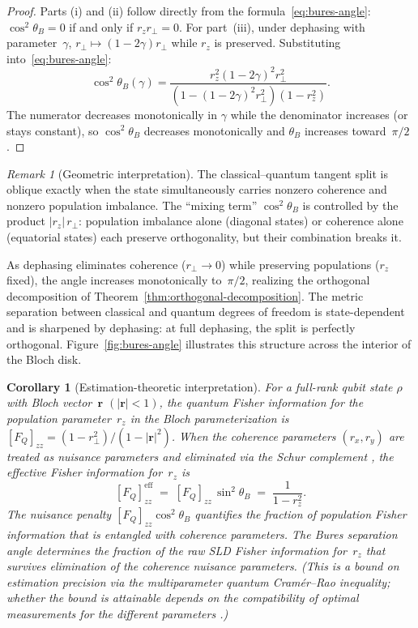 \documentclass[12pt,a4paper]{article}
\newtheorem{corollary}[theorem]{Corollary}
\theoremstyle{definition}
\theoremstyle{remark}
\newtheorem{remark}[theorem]{Remark}
\begin{document}
\begin{proof}
Parts (i) and (ii) follow directly from the formula~\eqref{eq:bures-angle}: $\cos^2\theta_B = 0$ if and only if $r_z r_\perp = 0$.  For part~(iii), under dephasing with parameter~$\gamma$, $r_\perp \mapsto (1-2\gamma) r_\perp$ while $r_z$ is preserved.  Substituting into~\eqref{eq:bures-angle}:
\[
\cos^2\theta_B(\gamma) = \frac{r_z^2 (1-2\gamma)^2 r_\perp^2}{(1 - (1-2\gamma)^2 r_\perp^2)(1 - r_z^2)}.
\]
The numerator decreases monotonically in $\gamma$ while the denominator increases (or stays constant), so $\cos^2\theta_B$ decreases monotonically and $\theta_B$ increases toward~$\pi/2$.
\end{proof}

\begin{remark}[Geometric interpretation]
\label{rem:angle-interpretation}
The classical--quantum tangent split is oblique exactly when the state simultaneously carries nonzero coherence and nonzero population imbalance.  The ``mixing term'' $\cos^2\theta_B$ is controlled by the product $|r_z|\, r_\perp$: population imbalance alone (diagonal states) or coherence alone (equatorial states) each preserve orthogonality, but their combination breaks it.

As dephasing eliminates coherence ($r_\perp \to 0$) while preserving populations ($r_z$ fixed), the angle increases monotonically to~$\pi/2$, realizing the orthogonal decomposition of Theorem~\ref{thm:orthogonal-decomposition}.  The metric separation between classical and quantum degrees of freedom is state-dependent and is sharpened by dephasing: at full dephasing, the split is perfectly orthogonal.  Figure~\ref{fig:bures-angle} illustrates this structure across the interior of the Bloch disk.
\end{remark}

\begin{corollary}[Estimation-theoretic interpretation]
\label{cor:estimation}
For a full-rank qubit state $\rho$ with Bloch vector~$\mathbf{r}$ $(|\mathbf{r}| < 1)$, the quantum Fisher information for the population parameter~$r_z$ in the Bloch parameterization is $[F_Q]_{zz} = (1 - r_\perp^2)/(1 - |\mathbf{r}|^2)$.  When the coherence parameters $(r_x, r_y)$ are treated as nuisance parameters and eliminated via the Schur complement \cite{zhang2025hybrid,albarelli2019restoring}, the effective Fisher information for~$r_z$ is
\begin{equation}
\label{eq:fzz-eff}
[F_Q]_{zz}^{\mathrm{eff}} \;=\; [F_Q]_{zz}\,\sin^2\theta_B \;=\; \frac{1}{1 - r_z^2}.
\end{equation}
The nuisance penalty $[F_Q]_{zz}\cos^2\theta_B$ quantifies the fraction of population Fisher information that is entangled with coherence parameters.  The Bures separation angle determines the fraction of the raw SLD Fisher information for~$r_z$ that survives elimination of the coherence nuisance parameters.  (This is a bound on estimation precision via the multiparameter quantum Cram\'er--Rao inequality; whether the bound is attainable depends on the compatibility of optimal measurements for the different parameters \cite{albarelli2019restoring,wang2024multiparameter}.)
\end{corollary}
\end{document}
